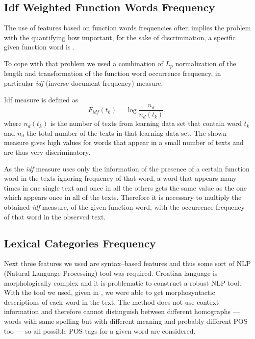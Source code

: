 \documentclass{llncs}
\begin{document}
\subsection{Idf Weighted Function Words Frequency}
\label{sec:funkcijske-rijeci-idf}

The use of features based on function words frequencies often implies the
problem with the quantifying how important, for the sake of discrimination, a
specific given function word is \cite{diederich2003authorship}.

To cope with that problem we used a combination of $L_p$ normalization of the
length and transformation of the function word occurrence frequency, in
particular \emph{idf} (inverse document frequency) measure.

Idf measure is defined as \cite{diederich2003authorship}
\begin{equation}
F_{idf}(t_k) = \log \frac{n_d}{n_d(t_k)},
\label{equ:idf}
\end{equation}
where $n_d(t_k)$ is the number of texts from learning data set that contain word
$t_k$ and $n_d$ the total number of the texts in that learning data set. The
shown measure gives high values for words that appear in a small number of
texts and are thus very discriminatory.

As the \emph{idf} measure uses only the information of the presence of a
certain function word in the texts ignoring frequency of that word, a word that appears
many times in one single text and once in all the others gets the same value as
the one which appears once in all of the texts. Therefore it is necessary to
multiply the obtained \emph{idf} measure, of the given function word, with the
occurrence frequency of that word in the observed text.

\subsection{Lexical Categories Frequency}
\label{sec:rijeci-grupe}
Next three features we used are syntax--based features and thus some sort of NLP
(Natural Language Processing) tool was required. Croatian language is
morphologically complex and it is problematic to construct a robust NLP tool.
With the tool we used, given in \cite{snajder08automatic}, we were able to get
morphosyntactic descriptions of each word in the text. The method does not
use context information and therefore cannot distinguish between different
homographs --- words with same spelling but with different meaning and probably
different POS too --- so all possible POS tags for a given word are considered.
\end{document}
